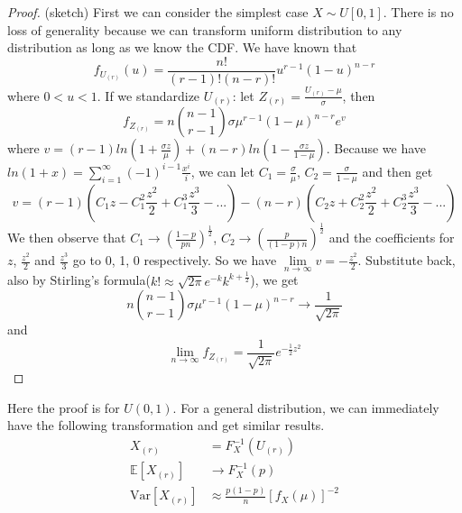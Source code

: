 \documentclass[twoside]{article}
\begin{document}
	\begin{proof}
	(sketch) First we can consider the simplest case $X \sim U[0,1]$. There is no loss of generality because we can transform uniform distribution to any distribution as long as we know the CDF. We have known that 
	$$
	f_{U_{(r)}} (u) = \frac{n!}{(r-1)!(n-r)!} u^{r-1} (1-u)^{n-r}
	$$
	where $0<u<1$. If we standardize $U_{(r)}$: let $Z_{(r)} = \frac{U_{(r)} - \mu}{\sigma}$, then
	$$
	f_{Z_{(r)}} = n \binom{n-1}{r-1} \sigma \mu^{r-1} (1 - \mu)^{n-r} e^v 
	$$
	where $v = (r-1) ln \left( 1 + \frac{\sigma z}{\mu} \right) + (n-r) ln \left( 1 - \frac{\sigma z}{1 - \mu} \right)$. Because we have $ln \left( 1+x \right) = \sum_{i=1}^{\infty} (-1)^{i-1} \frac{x^i}{i}$, we can let $C_1 = \frac{\sigma}{\mu}$, $C_2 = \frac{\sigma}{1 - \mu}$ and then get
	$$
	v = (r-1) \left( C_1 z - C_1^2 \frac{z^2}{2} + C_1^3 \frac{z^3}{3} - ... \right) - (n-r) \left( C_2 z + C_2^2 \frac{z^2}{2} + C_2^3 \frac{z^3}{3} - ... \right)
	$$
	We then observe that $C_1 \to \left( \frac{1-p}{pn} \right)^{\frac{1}{2}}$, $C_2 \to \left( \frac{p}{(1-p)n} \right)^{\frac{1}{2}}$ and the coefficients for $z$, $\frac{z^2}{2}$ and $\frac{z^3}{3}$ go to 0, 1, 0 respectively. So we have $\lim\limits_{n \to \infty} v = - \frac{z^2}{2}$. Substitute back, also by Stirling's formula($k! \approx \sqrt{2 \pi} e^{-k} k^{k + \frac{1}{2}}$), we get
	$$
	n \binom{n-1}{r-1} \sigma \mu^{r-1} (1 - \mu)^{n-r} \to \frac{1}{\sqrt{2 \pi}}
	$$
	and 
	$$
	\lim\limits_{n \to \infty} f_{Z_{(r)}} = \frac{1}{\sqrt{2 \pi}} e^{- \frac{1}{2} z^2}
	$$
	\end{proof}

	Here the proof is for $U(0,1)$. For a general distribution, we can immediately have the following transformation and get similar results. 
	\begin{align*}
		X_{(r)} &= F_X^{-1} \left( U_{(r)} \right) \\
		\mathbb{E}[X_{(r)}] &\to F_X^{-1} (p) \\
		\mathrm{Var}[X_{(r)}] &\approx \frac{p(1-p)}{n} [f_X(\mu)]^{-2}
	\end{align*}
	
\end{document}
